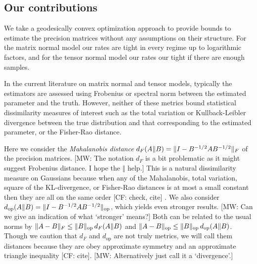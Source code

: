 \documentclass[aos]{imsart}
\theoremstyle{definition}
\DeclareMathOperator{\op}{op}
\DeclarePairedDelimiter{\norm}{\lVert}{\rVert}
\newcommand{\CF}[1]{{\color{purple}[CF: #1]}}
\newcommand{\MW}[1]{{\color{red}[MW: #1]}}
\begin{document}
\subsection{Our contributions}
We take a geodesically convex optimization approach to provide bounds to estimate the precision matrices without any assumptions on their structure.
For the matrix normal model our rates are tight in every regime up to logarithmic factors, and for the tensor normal model our rates our tight if there are enough samples.

In the current literature on matrix normal and tensor models, typically the estimators are assessed using Frobenius or spectral norm between the estimated parameter and the truth.
However, neither of these metrics bound statistical dissimilarity measures of interest such as the total variation or Kullback-Leibler divergence between the true distribution and that corresponding to the estimated parameter, or the Fisher-Rao distance.

Here we consider the \emph{Mahalanobis distance} $d_{F}(A \Vert B) = \norm{I - B^{-1/2} A B^{-1/2}}_F$ of the precision matrices.
\MW{The notation $d_F$ is a bit problematic as it might suggest Frobenius distance. I hope the $\Vert$ help.}
This is a natural dissimilarity measure on Gaussians because when any of the Mahalanobis, total variation, square of the KL-divergence, or Fisher-Rao distances is at most a small constant then they are all on the same order \CF{check, cite} \citep{barsov1987estimates}.
We also consider $d_{\op}(A \Vert B) = \norm{I - B^{-1/2} A B^{-1/2}}_{\op}$, which yields even stronger results.
\MW{Can we give an indication of what `stronger' means?}
Both can be related to the usual norms by $\norm{A - B}_F \leq \norm{B}_{\op} \, d_F(A\Vert B)$ and $\norm{A  - B}_{\op} \leq \norm{B}_{\op} \, d_{\op}(A \Vert B)$.
Though we caution that $d_F$ and $d_{\op}$ are not truly metrics, we will call them distances because they are obey approximate symmetry and an approximate triangle inequality \CF{cite}.
\MW{Alternatively just call it a `divergence'.}
\end{document}
